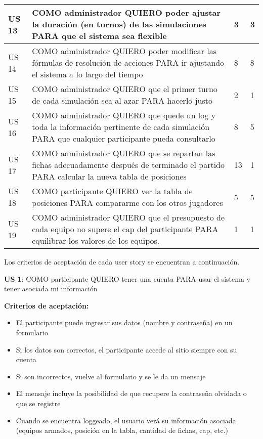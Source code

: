 \begin{center}
\begin{tabular}{| l | p{10cm} | l | l | }
US 13 & COMO administrador QUIERO poder ajustar la duración (en turnos) de las simulaciones PARA que el sistema sea flexible & 3 & 3\\  \hline
US 14 & COMO administrador QUIERO poder modificar las fórmulas de resolución de acciones PARA ir ajustando el sistema a lo largo del tiempo & 8 & 8\\  \hline
US 15 & COMO administrador QUIERO que el primer turno de cada simulación sea al azar PARA hacerlo justo & 2 & 1\\  \hline
US 16 & COMO administrador QUIERO que quede un log y toda la información pertinente de cada simulación PARA que cualquier participante pueda consultarlo & 8 & 5\\  \hline
US 17 & COMO administrador QUIERO que se repartan las fichas adecuadamente después de terminado el partido PARA calcular la nueva tabla de posiciones & 13 & 1\\  \hline
US 18 & COMO participante QUIERO ver la tabla de posiciones PARA compararme con los otros jugadores & 5 & 5\\  \hline
US 19 & COMO administrador QUIERO que el presupuesto de cada equipo no supere el cap del participante PARA equilibrar los valores de los equipos. & 1 & 1\\  \hline
  \end{tabular}
\end{center}

Los criterios de aceptación de cada user story se encuentran a continuación.


\begin{tcolorbox}
\textbf{US 1}: COMO participante QUIERO tener una cuenta PARA usar el sistema y tener asociada mi información

\vline

\textbf{Criterios de aceptación:}
\begin{itemize}
 \item El participante puede ingresar sus datos (nombre y contraseña) en un formulario
 \item Si los datos son correctos, el participante accede al sitio siempre con su cuenta
 \item Si son incorrectos, vuelve al formulario y se le da un mensaje
 \item El mensaje incluye la posibilidad de que recupere la contraseña olvidada o que se registre
 \item Cuando se encuentra loggeado, el usuario verá su información asociada (equipos armados, posición en la tabla, cantidad de fichas, cap, etc.)
\end{itemize}
\end{tcolorbox}
\vspace{10pt}

